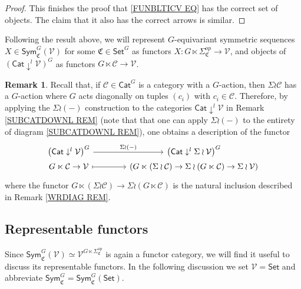 \documentclass[a4paper,10pt
,draft
]{article}%
\numberwithin{equation}{section}
\numberwithin{figure}{section}
\theoremstyle{definition} %
\newtheorem{remark}[equation]{Remark}%
\newcommand{\V}{\ensuremath{\mathcal V}}
\newcommand{\1}{\ensuremath{\mathbbm 1}}%
\begin{document}
\begin{proof}
	This finishes the proof that \eqref{FUNBLTICV EQ} has the correct set of objects. The claim that it also has the correct arrows is similar.
\end{proof}


Following the result above, 
we will represent $G$-equivariant symmetric sequences
$X \in \mathsf{Sym}^G_{\mathfrak{C}}(\mathcal{V})$
for some $\mathfrak{C} \in \mathsf{Set}^G$
as functors
$X \colon G \ltimes \Sigma_{\mathfrak{C}}^{op} \to \mathcal{V}$,
and objects of
$\left( \mathsf{Cat} \downarrow^{l} \mathcal{V} \right)^G$
as functors $G \ltimes \mathcal{C} \to \V$.


\begin{remark}\label{RHOPURP REM}
	Recall that, if $\mathcal{C}\in \mathsf{Cat}^G$ is a category with a $G$-action,
	then 
	$\Sigma \wr \mathcal{C}$
	has a $G$-action where $G$ acts diagonally on tuples $(c_i)$ with $c_i \in \mathcal{C}$.
	Therefore, by applying the 
	$\Sigma \wr (-)$
	construction to the categories
	$\mathsf{Cat} \downarrow^l \V$
	in Remark \ref{SUBCATDOWNL REM}
	(note that that one can apply $\Sigma \wr (-)$
	to the entirety of diagram \eqref{SUBCATDOWNL REM}),
	one obtains a description of the functor
	\begin{equation}\label{RHOPURP EQ}
	\begin{tikzcd}[column sep =40,row sep =0]
	\left( \mathsf{Cat} \downarrow^{l} \mathcal{V} \right)^G
	\ar{r}{\Sigma \wr (-) } &
	\left( \mathsf{Cat} \downarrow^{l} \Sigma \wr \mathcal{V} \right)^G
	\\
	G \ltimes \mathcal{C} \to \mathcal{V} \ar[mapsto]{r} &
	\left(G \ltimes (\Sigma \wr \mathcal{C}) \to 
	\Sigma \wr (G \ltimes  \mathcal{C}) \to \Sigma \wr \mathcal{V}\right)
	\end{tikzcd}
	\end{equation}
	where the functor
	$G \ltimes (\Sigma \wr \mathcal{C}) \to 
	\Sigma \wr (G \ltimes  \mathcal{C})$
	is the natural inclusion described in Remark \ref{WRDIAG REM}.
\end{remark}


\subsection{Representable functors}
\label{REPFUN_SEC}

Since  
$\mathsf{Sym}^G_{\mathfrak{C}}(\mathcal{V}) \simeq 
\V^{G \ltimes \Sigma^{op}_{\mathfrak{C}}}$ is again a functor category, 
we will find it useful to discuss its representable functors.
In the following discussion 
we set $\V = \mathsf{Set}$ and abbreviate
$\mathsf{Sym}^G_{\mathfrak{C}} = \mathsf{Sym}^G_{\mathfrak{C}}(\mathsf{Set})$.
\end{document}

